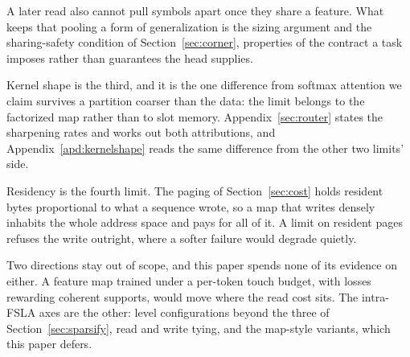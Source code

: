 A later read also cannot pull symbols apart once they share a feature. What keeps that pooling a form of generalization is the sizing argument and the sharing-safety condition of Section~\ref{sec:corner}, properties of the contract a task imposes rather than guarantees the head supplies.

Kernel shape is the third, and it is the one difference from softmax attention we claim survives a partition coarser than the data: the limit belongs to the factorized map rather than to slot memory. Appendix~\ref{sec:router} states the sharpening rates and works out both attributions, and Appendix~\ref{apd:kernelshape} reads the same difference from the other two limits' side.

Residency is the fourth limit. The paging of Section~\ref{sec:cost} holds resident bytes proportional to what a sequence wrote, so a map that writes densely inhabits the whole address space and pays for all of it. A limit on resident pages refuses the write outright, where a softer failure would degrade quietly.

Two directions stay out of scope, and this paper spends none of its evidence on either. A feature map trained under a per-token touch budget, with losses rewarding coherent supports, would move where the read cost sits. The intra-FSLA axes are the other: level configurations beyond the three of Section~\ref{sec:sparsify}, read and write tying, and the map-style variants, which this paper defers.
